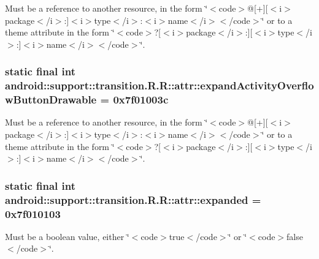 Must be a reference to another resource, in the form \char`\"{}$<$code$>$@\mbox{[}+\mbox{]}\mbox{[}$<$i$>$package$<$/i$>$:\mbox{]}$<$i$>$type$<$/i$>$:$<$i$>$name$<$/i$>$$<$/code$>$\char`\"{} or to a theme attribute in the form \char`\"{}$<$code$>$?\mbox{[}$<$i$>$package$<$/i$>$:\mbox{]}\mbox{[}$<$i$>$type$<$/i$>$:\mbox{]}$<$i$>$name$<$/i$>$$<$/code$>$\char`\"{}. \hypertarget{classandroid_1_1support_1_1transition_1_1_r_1_1attr_bedbdb3d8e06654105fcb7ab2e300f05}{
\subsubsection[{expandActivityOverflowButtonDrawable}]{\setlength{\rightskip}{0pt plus 5cm}static final int android::support::transition.R.R::attr::expandActivityOverflowButtonDrawable = 0x7f01003c}}
\label{classandroid_1_1support_1_1transition_1_1_r_1_1attr_bedbdb3d8e06654105fcb7ab2e300f05}


Must be a reference to another resource, in the form \char`\"{}$<$code$>$@\mbox{[}+\mbox{]}\mbox{[}$<$i$>$package$<$/i$>$:\mbox{]}$<$i$>$type$<$/i$>$:$<$i$>$name$<$/i$>$$<$/code$>$\char`\"{} or to a theme attribute in the form \char`\"{}$<$code$>$?\mbox{[}$<$i$>$package$<$/i$>$:\mbox{]}\mbox{[}$<$i$>$type$<$/i$>$:\mbox{]}$<$i$>$name$<$/i$>$$<$/code$>$\char`\"{}. \hypertarget{classandroid_1_1support_1_1transition_1_1_r_1_1attr_bd5c9d65a751ed823315a3f2022d47a2}{
\subsubsection[{expanded}]{\setlength{\rightskip}{0pt plus 5cm}static final int android::support::transition.R.R::attr::expanded = 0x7f010103}}
\label{classandroid_1_1support_1_1transition_1_1_r_1_1attr_bd5c9d65a751ed823315a3f2022d47a2}


Must be a boolean value, either \char`\"{}$<$code$>$true$<$/code$>$\char`\"{} or \char`\"{}$<$code$>$false$<$/code$>$\char`\"{}. 

